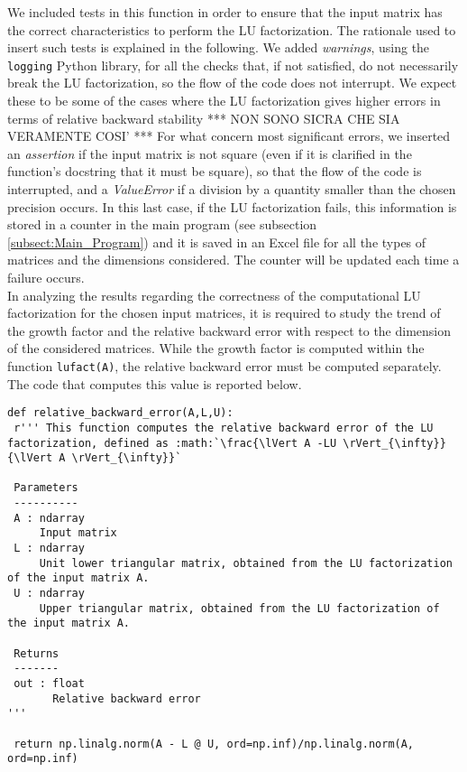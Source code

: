 \documentclass[a4paper,11pt]{report}
\begin{document}
\noindent We included tests in this function in order to ensure that the input matrix has the correct characteristics to perform the LU factorization. The rationale used to insert such tests is explained in the following. We added \textit{warnings}, using the \texttt{logging} Python library, for all the checks that, if not satisfied, do not necessarily break the LU factorization, so the flow of the code does not interrupt. We expect these to be some of the cases where the LU factorization gives higher errors in terms of relative backward stability *** NON SONO SICRA CHE SIA VERAMENTE COSI' ***
For what concern most significant errors, we inserted an \textit{assertion} if the input matrix is not square (even if it is clarified in the function's docstring that it must be square), so that the flow of the code is interrupted, and a \textit{ValueError} if a division by a quantity smaller than the chosen precision occurs. In this last case, if the LU factorization fails, this information is stored in a counter in the main program (see subsection \ref{subsect:Main_Program}) and it is saved in an Excel file for all the types of matrices and the dimensions considered. The counter will be updated each time a failure occurs.\\

\noindent In analyzing the results regarding the correctness of the computational LU factorization for the chosen input matrices, it is required to study the trend of the growth factor and the relative backward error with respect to the dimension of the considered matrices. While the growth factor is computed within the function \texttt{lufact(A)}, the relative backward error must be computed separately. The code that computes this value is reported below.

\begin{verbatim}
def relative_backward_error(A,L,U):
 r''' This function computes the relative backward error of the LU factorization, defined as :math:`\frac{\lVert A -LU \rVert_{\infty}}{\lVert A \rVert_{\infty}}`

 Parameters
 ----------
 A : ndarray
     Input matrix
 L : ndarray
     Unit lower triangular matrix, obtained from the LU factorization of the input matrix A.
 U : ndarray
     Upper triangular matrix, obtained from the LU factorization of the input matrix A.

 Returns
 -------
 out : float
       Relative backward error
'''

 return np.linalg.norm(A - L @ U, ord=np.inf)/np.linalg.norm(A, ord=np.inf)
\end{verbatim}
\end{document}
